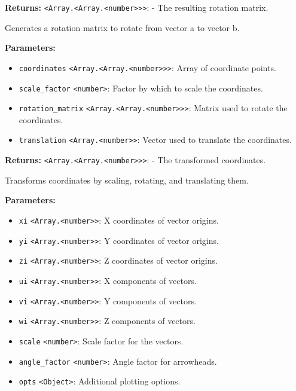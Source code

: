 \documentclass[12pt,a4paper]{article}
\begin{document}
\noindent \textbf{Returns:} \texttt{<Array.<Array.<number>>>}: - The resulting rotation matrix.

\noindent Generates a rotation matrix to rotate from vector a to vector b.

\vspace{5mm}
\noindent {}


\noindent \textbf{Parameters:}
\begin{itemize}
  \item \texttt{coordinates} \texttt{<Array.<Array.<number>>>}: Array of coordinate points.
  \item \texttt{scale\_factor} \texttt{<number>}: Factor by which to scale the coordinates.
  \item \texttt{rotation\_matrix} \texttt{<Array.<Array.<number>>>}: Matrix used to rotate the coordinates.
  \item \texttt{translation} \texttt{<Array.<number>>}: Vector used to translate the coordinates.
\end{itemize}

\noindent \textbf{Returns:} \texttt{<Array.<Array.<number>>>}: - The transformed coordinates.

\noindent Transforms coordinates by scaling, rotating, and translating them.

\vspace{5mm}
\noindent {}


\noindent \textbf{Parameters:}
\begin{itemize}
  \item \texttt{xi} \texttt{<Array.<number>>}: X coordinates of vector origins.
  \item \texttt{yi} \texttt{<Array.<number>>}: Y coordinates of vector origins.
  \item \texttt{zi} \texttt{<Array.<number>>}: Z coordinates of vector origins.
  \item \texttt{ui} \texttt{<Array.<number>>}: X components of vectors.
  \item \texttt{vi} \texttt{<Array.<number>>}: Y components of vectors.
  \item \texttt{wi} \texttt{<Array.<number>>}: Z components of vectors.
  \item \texttt{scale} \texttt{<number>}: Scale factor for the vectors.
  \item \texttt{angle\_factor} \texttt{<number>}: Angle factor for arrowheads.
  \item \texttt{opts} \texttt{<Object>}: Additional plotting options.
\end{itemize}
\end{document}
